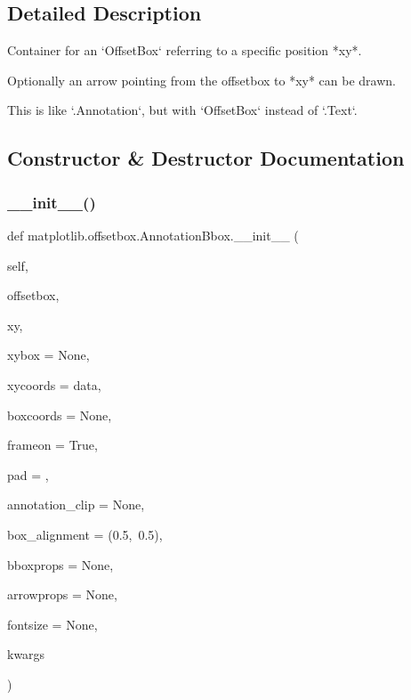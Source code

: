 \subsection{Detailed Description}
\begin{DoxyVerb}Container for an `OffsetBox` referring to a specific position *xy*.

Optionally an arrow pointing from the offsetbox to *xy* can be drawn.

This is like `.Annotation`, but with `OffsetBox` instead of `.Text`.
\end{DoxyVerb}
 

\subsection{Constructor \& Destructor Documentation}
\mbox{\label{classmatplotlib_1_1offsetbox_1_1AnnotationBbox_a92b4f807ca396315076147136686b317}} 
\subsubsection{\texorpdfstring{\+\_\+\+\_\+init\+\_\+\+\_\+()}{\_\_init\_\_()}}
{\footnotesize\ttfamily def matplotlib.\+offsetbox.\+Annotation\+Bbox.\+\_\+\+\_\+init\+\_\+\+\_\+ (\begin{DoxyParamCaption}\item[{}]{self,  }\item[{}]{offsetbox,  }\item[{}]{xy,  }\item[{}]{xybox = {\ttfamily None},  }\item[{}]{xycoords = {\ttfamily \textquotesingle{}data\textquotesingle{}},  }\item[{}]{boxcoords = {\ttfamily None},  }\item[{}]{frameon = {\ttfamily True},  }\item[{}]{pad = {},  }\item[{}]{annotation\+\_\+clip = {\ttfamily None},  }\item[{}]{box\+\_\+alignment = {\ttfamily (0.5,~0.5)},  }\item[{}]{bboxprops = {\ttfamily None},  }\item[{}]{arrowprops = {\ttfamily None},  }\item[{}]{fontsize = {\ttfamily None},  }\item[{}]{kwargs }\end{DoxyParamCaption})}

